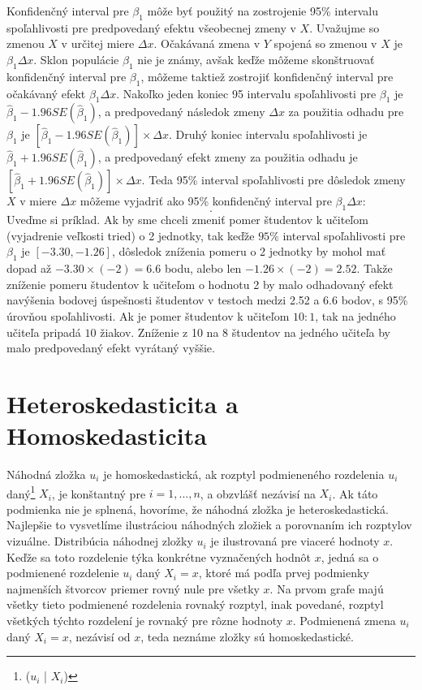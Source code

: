 \documentclass[]{tukediphc}
\begin{document}
Konfidenčný interval pre $\beta_1$ môže byť použitý na zostrojenie 95\% intervalu spoľahlivosti pre predpovedaný efektu všeobecnej zmeny v $X$. Uvažujme so zmenou $X$ v určitej miere $\Delta x$. Očakávaná zmena v $Y$ spojená so zmenou v $X$ je $\beta_{1} \Delta x$. Sklon populácie $\beta_1$ nie je známy, avšak keďže môžeme skonštruovať konfidenčný interval pre $\beta_1$, môžeme taktiež zostrojiť konfidenčný interval pre očakávaný efekt $\beta_{1} \Delta x$. Nakoľko jeden koniec 95 intervalu spoľahlivosti pre $\beta_1$ je $\hat\beta_{1} - 1.96SE(\hat\beta_{1})$, a predpovedaný následok zmeny $\Delta x$ za použitia odhadu pre $\beta_1$ je $[\hat\beta_{1} - 1.96SE(\hat\beta_{1})] \times \Delta x$. Druhý koniec intervalu spoľahlivosti je $\hat\beta_{1} + 1.96SE(\hat\beta_{1})$, a predpovedaný efekt zmeny za použitia odhadu je $[\hat\beta_{1} + 1.96SE(\hat\beta_{1})] \times \Delta x$. Teda 95\% interval spoľahlivosti pre dôsledok zmeny $X$ v miere $\Delta x$ môžeme vyjadriť ako 95\% konfidenčný interval pre $\beta_{1} \Delta x$:
\begin{equation}
   [\hat\beta_{1} - 1.96SE(\hat\beta_{1})\Delta x \ , \ \hat\beta_{1} + 1.96SE(\hat\beta_{1})\Delta x]. 
\end{equation}
Uveďme si príklad. Ak by sme chceli zmeniť pomer študentov k učiteľom (vyjadrenie veľkosti tried) o 2 jednotky, tak keďže $95\%$ interval spoľahlivosti pre $\beta_1$ je $[-3.30, -1.26]$, dôsledok zníženia pomeru o 2 jednotky by mohol mať dopad až $-3.30 \times (-2) = 6.6$ bodu, alebo len $-1.26 \times (-2) = 2.52$. Takže zníženie pomeru študentov k učiteľom o hodnotu 2 by malo odhadovaný efekt navýšenia bodovej úspešnosti študentov v testoch medzi 2.52 a 6.6 bodov, s 95\% úrovňou spoľahlivosti. Ak je pomer študentov k učiteľom $10:1$, tak na jedného učiteľa pripadá $10$ žiakov. Zníženie z 10 na 8 študentov na jedného učiteľa by malo predpovedaný efekt vyrátaný vyššie. 

\newpage
\section{Heteroskedasticita a Homoskedasticita}

Náhodná zložka ${u}_{i}$  je homoskedastická, ak rozptyl podmieneného rozdelenia ${u}_{i}$ daný\footnote{(${u}_{i}$ | $X_{i}$)} $X_{i}$, je konštantný pre $i = 1, ..., n$, a obzvlášť nezávisí na $X_{i}$. Ak táto podmienka nie je splnená, hovoríme, že náhodná zložka je heteroskedastická. Najlepšie to vysvetlíme ilustráciou náhodných zložiek a porovnaním ich rozptylov vizuálne. Distribúcia náhodnej zložky ${u}_{i}$ je ilustrovaná pre viaceré hodnoty $x$. Keďže sa toto rozdelenie týka konkrétne vyznačených hodnôt $x$, jedná sa o podmienené rozdelenie ${u}_{i}$ daný $X_{i} = x$, ktoré má podľa prvej podmienky najmenších štvorcov priemer rovný nule pre všetky $x$. Na prvom grafe majú všetky tieto podmienené rozdelenia rovnaký rozptyl, inak povedané, rozptyl všetkých týchto rozdelení je rovnaký pre rôzne hodnoty $x$. Podmienená zmena ${u}_{i}$ daný $X_{i} = x$, nezávisí od $x$, teda neznáme zložky sú homoskedastické. 
\end{document}
